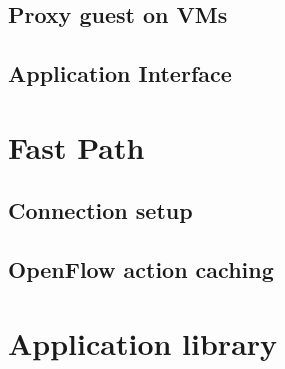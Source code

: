\subsection{Proxy guest on VMs}
\subsection{Application Interface}

\section{Fast Path}
\subsection{Connection setup}
\subsection{OpenFlow action caching}

\section{Application library}